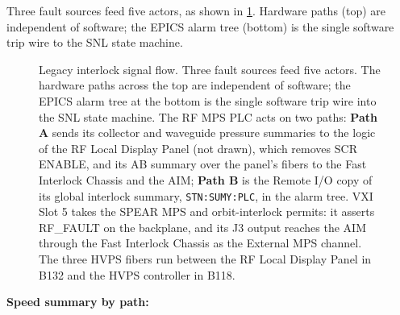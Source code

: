 Three fault sources feed five actors, as shown in \cref{fig:signal-flow}. Hardware paths (top) are independent of software; the EPICS alarm tree (bottom) is the single software trip wire to the SNL state machine.

\begin{figure}[tbp]
\centering
\begin{fitpicture}\end{fitpicture}
\caption[Legacy interlock signal flow.]{Legacy interlock signal flow. Three fault sources feed five actors. The hardware paths across the top are independent of software; the EPICS alarm tree at the bottom is the single software trip wire into the SNL state machine. The RF MPS PLC acts on two paths: \textbf{Path A} sends its collector and waveguide pressure summaries to the logic of the RF Local Display Panel (not drawn), which removes SCR ENABLE, and its AB summary over the panel's fibers to the Fast Interlock Chassis and the AIM; \textbf{Path B} is the Remote I/O copy of its global interlock summary, \texttt{STN:SUMY:PLC}, in the alarm tree. VXI Slot 5 takes the SPEAR MPS and orbit-interlock permits: it asserts RF\_FAULT on the backplane, and its J3 output reaches the AIM through the Fast Interlock Chassis as the External MPS channel. The three HVPS fibers run between the RF Local Display Panel in B132 and the HVPS controller in B118.}\label{fig:signal-flow}
\end{figure}

\textbf{Speed summary by path:}

